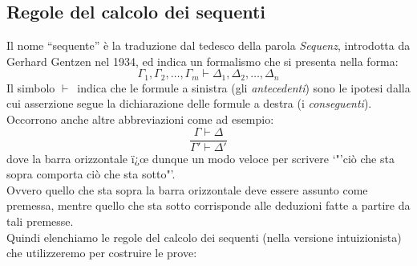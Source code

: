 \subsection{Regole del calcolo dei sequenti}
Il nome "`sequente"' \`e la traduzione dal tedesco della parola {\itshape Sequenz}, introdotta da Gerhard Gentzen nel 1934, ed indica un formalismo che si presenta nella forma:
$$\Gamma_1,\Gamma_2,\dots,\Gamma_m\vdash\Delta_1,\Delta_2,\dots,\Delta_n$$
Il simbolo $\vdash$\ indica che le formule a sinistra (gli {\itshape antecedenti}) sono le ipotesi dalla cui asserzione segue la dichiarazione delle formule a destra (i {\itshape conseguenti}).\\
Occorrono anche altre abbreviazioni come ad esempio:
$$\frac{\Gamma\vdash\Delta}{\Gamma'\vdash\Delta'}$$
dove la barra orizzontale ï¿œ dunque un modo veloce per scrivere `"'ci\`o che sta sopra comporta ci\`o che sta sotto"'.\\
Ovvero quello che sta sopra la barra orizzontale deve essere assunto come premessa, mentre quello che sta sotto corrisponde alle deduzioni fatte a partire da tali premesse.\\
Quindi elenchiamo le regole del calcolo dei sequenti (nella versione intuizionista) che utilizzeremo per costruire le prove:
